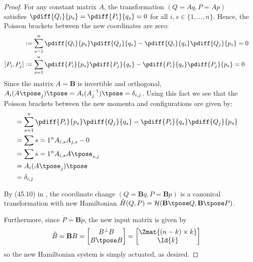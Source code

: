 \begin{proof}
    For any constant matrix \(A\), the transformation
    \((Q = Aq, P = Ap)\) satisfies
    \(\pdiff{Q_i}{p_s} = \pdiff{P_i}{q_s} = 0\) for all 
    \(i,s \in \{1,\ldots,n\}\). Hence, the Poisson brackets between the
    new coordinates are zero:
    \begin{align*}
        [Q_i,Q_j] &:= \sum\limits_{s = 1}^n \pdiff{Q_i}{p_s}\pdiff{Q_j}{q_s} - 
        \pdiff{Q_i}{q_s}\pdiff{Q_j}{p_s} = 0 \\
        [P_i,P_j] &:= \sum\limits_{s=1}^n \pdiff{P_i}{p_s}\pdiff{P_j}{q_s} -
        \pdiff{P_i}{q_s}\pdiff{P_j}{p_s} = 0
    \end{align*}
    Since the matrix \(A = \mathbf{B}\) is invertible and orthogonal,
    \(A_i (A\tpose_j)\tpose = A_i (A^{-1}_j)\tpose = \delta_{i,j}\). Using this
    fact we see that the Poisson brackets between the new momenta and
    configurations are given by:
    \begin{align*}
        [P_i,Q_j] &= \sum\limits_{s=1}^n\pdiff{P_i}{p_s}\pdiff{Q_j}{q_s}
        - \pdiff{P_i}{q_s}\pdiff{Q_j}{p_s} \\
                  &= \sum\limits{s=1}^n A_{i,s}A_{j,s} - 0 \\
                  &= \sum\limits{s=1}^n A_{i,s}A\tpose_{s,j} \\
                  &= A_i (A\tpose_j)\tpose \\
                  &= \delta_{i,j}
    \end{align*}

    By (45.10) in \cite{landau_mechanics}, the coordinate change
    \((Q = \mathbf{B}q, P = \mathbf{B}p)\) is a canonical transformation with
    new Hamiltonian 
    \(\hat{H}(Q,P) = \mathcal{H}(\mathbf{B}\tpose Q,\mathbf{B}\tpose P)\).

    Furthermore, since \(\dot{P} = \mathbf{B}\dot{p}\), the new input matrix is
    given by 
    \[
        \hat{B} = \mathbf{B}B = \begin{bmatrix}
            B^\perp B \\
            B\tpose B \\
        \end{bmatrix} = 
        \begin{bmatrix}
            \Zmat{(n-k)\times k} \\
            \Id{k}
        \end{bmatrix}
    \]
    so the new Hamiltonian system is simply actuated, as desired.
\end{proof}

